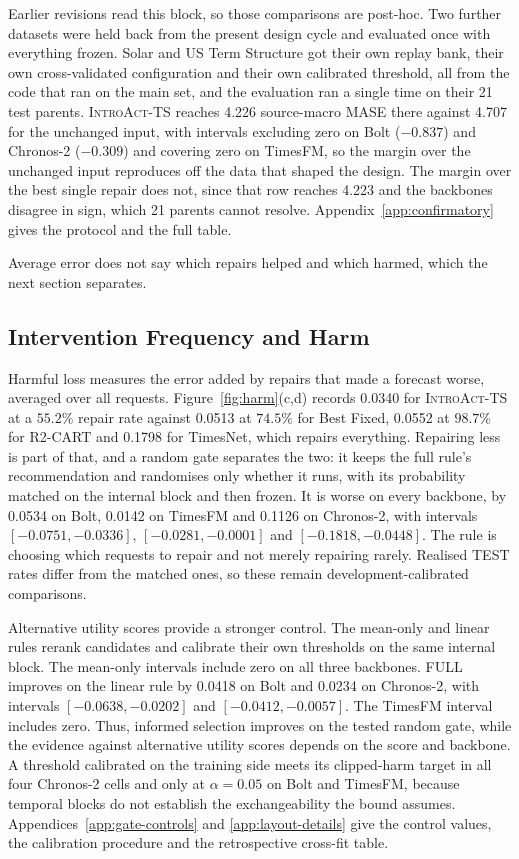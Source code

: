 \documentclass{article}
\newcommand{\introact}{\textsc{IntroAct-TS}}
\begin{document}
Earlier revisions read this block, so those comparisons are post-hoc. Two further datasets
were held back from the present design cycle and evaluated once with everything frozen. Solar
and US Term Structure got their own replay bank, their own cross-validated configuration and
their own calibrated threshold, all from the code that ran on the main set, and the evaluation
ran a single time on their 21 test parents. \introact{} reaches 4.226 source-macro MASE there
against 4.707 for the unchanged input, with intervals excluding zero on Bolt ($-0.837$) and
Chronos-2 ($-0.309$) and covering zero on TimesFM, so the margin over the unchanged input
reproduces off the data that shaped the design. The margin over the best single repair does
not, since that row reaches 4.223 and the backbones disagree in sign, which 21 parents cannot
resolve. Appendix~\ref{app:confirmatory} gives the protocol and the full table.

Average error does not say which repairs helped and which harmed, which the next section
separates.

\subsection{Intervention Frequency and Harm}
\label{sec:exp-harm}
Harmful loss measures the error added by repairs that made a forecast worse, averaged over
all requests. Figure~\ref{fig:harm}(c,d) records 0.0340 for \introact{} at a $55.2\%$ repair
rate against 0.0513 at $74.5\%$ for Best Fixed, 0.0552 at $98.7\%$ for R2-CART and 0.1798 for
TimesNet, which repairs everything. Repairing less is part of that, and a random gate
separates the two: it keeps the full rule's recommendation and randomises only whether it
runs, with its probability matched on the internal block and then frozen. It is worse on every
backbone, by 0.0534 on Bolt, 0.0142 on TimesFM and 0.1126 on Chronos-2, with intervals
$[-0.0751,-0.0336]$, $[-0.0281,-0.0001]$ and $[-0.1818,-0.0448]$. The rule is choosing which
requests to repair and not merely repairing rarely. Realised TEST rates differ from the
matched ones, so these remain development-calibrated comparisons.

Alternative utility scores provide a stronger control. The mean-only and linear rules
rerank candidates and calibrate their own thresholds on the same internal block.
The mean-only intervals include zero on all three backbones. FULL improves on the linear
rule by 0.0418 on Bolt and 0.0234 on Chronos-2, with intervals
$[-0.0638,-0.0202]$ and $[-0.0412,-0.0057]$. The TimesFM interval includes zero.
Thus, informed selection improves on the tested random gate, while the evidence against
alternative utility scores depends on the score and backbone.
A threshold calibrated on the training side meets its clipped-harm target in all four
Chronos-2 cells and only at $\alpha=0.05$ on Bolt and TimesFM, because temporal blocks do
not establish the exchangeability the bound assumes.
Appendices~\ref{app:gate-controls} and \ref{app:layout-details} give the control values, the
calibration procedure and the retrospective cross-fit table.
\end{document}
